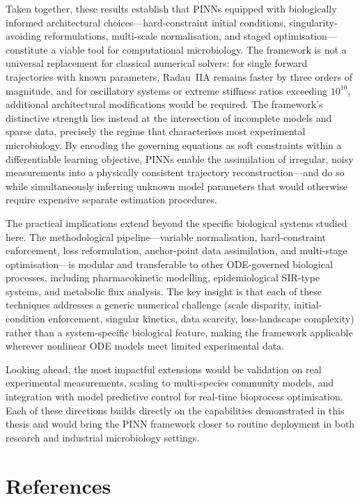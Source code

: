 \documentclass[14pt,a4paper,openany]{extbook}
\begin{document}
Taken together, these results establish that PINNs equipped with biologically informed architectural choices---hard-constraint initial conditions, singularity-avoiding reformulations, multi-scale normalisation, and staged optimisation---constitute a viable tool for computational microbiology. The framework is not a universal replacement for classical numerical solvers: for single forward trajectories with known parameters, Radau~IIA remains faster by three orders of magnitude, and for oscillatory systems or extreme stiffness ratios exceeding $10^{10}$, additional architectural modifications would be required. The framework's distinctive strength lies instead at the intersection of incomplete models and sparse data, precisely the regime that characterises most experimental microbiology. By encoding the governing equations as soft constraints within a differentiable learning objective, PINNs enable the assimilation of irregular, noisy measurements into a physically consistent trajectory reconstruction---and do so while simultaneously inferring unknown model parameters that would otherwise require expensive separate estimation procedures.

The practical implications extend beyond the specific biological systems studied here. The methodological pipeline---variable normalisation, hard-constraint enforcement, loss reformulation, anchor-point data assimilation, and multi-stage optimisation---is modular and transferable to other ODE-governed biological processes, including pharmacokinetic modelling, epidemiological SIR-type systems, and metabolic flux analysis. The key insight is that each of these techniques addresses a generic numerical challenge (scale disparity, initial-condition enforcement, singular kinetics, data scarcity, loss-landscape complexity) rather than a system-specific biological feature, making the framework applicable wherever nonlinear ODE models meet limited experimental data.

Looking ahead, the most impactful extensions would be validation on real experimental measurements, scaling to multi-species community models, and integration with model predictive control for real-time bioprocess optimisation. Each of these directions builds directly on the capabilities demonstrated in this thesis and would bring the PINN framework closer to routine deployment in both research and industrial microbiology settings.

\chapter*{References}
\printbibliography[heading=none]
\end{document}
